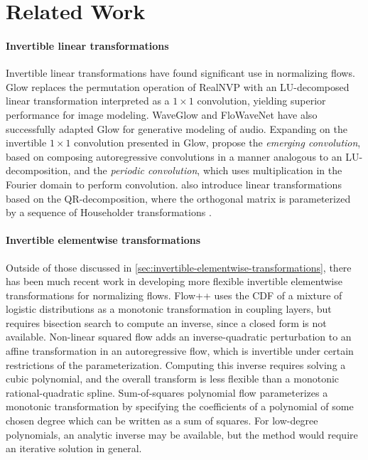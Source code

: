 \section{Related Work}

\paragraph{Invertible linear transformations} 
Invertible linear transformations have found significant use in normalizing flows. 
Glow \citep{Kingma:2018:glow} replaces the permutation operation of RealNVP with an LU-decomposed linear transformation interpreted as a $ 1 \!\times\! 1 $ convolution, yielding superior performance for image modeling. 
WaveGlow \citep{Prenger:2018:WaveGlow} and FloWaveNet \citep{Kim:2018:FloWaveNet} have also successfully adapted Glow for generative modeling of audio. 
Expanding on the invertible $ 1 \!\times\! 1 $ convolution presented in Glow, \citet{Hoogeboom:2019:emerging} propose the \emph{emerging convolution}, based on composing autoregressive convolutions in a manner analogous to an LU-decomposition, and the \emph{periodic convolution}, which uses multiplication in the Fourier domain to perform convolution. 
\citet{Hoogeboom:2019:emerging} also introduce linear transformations based on the QR-decomposition, where the orthogonal matrix is parameterized by a sequence of Householder transformations \citep{Tomczak:2016:householder}. 

\paragraph{Invertible elementwise transformations} 
Outside of those discussed in \cref{sec:invertible-elementwise-transformations}, there has been much recent work in developing more flexible invertible elementwise transformations for normalizing flows. 
Flow++ \citep{Ho:2019:flowpp} uses the CDF of  a mixture of logistic distributions as a monotonic transformation in coupling layers, but requires bisection search to compute an inverse, since a closed form is not available. 
Non-linear squared flow \citep{Ziegler:2019:latent_flows} adds an inverse-quadratic perturbation to an affine transformation in an autoregressive flow, which is invertible under certain restrictions of the parameterization. 
Computing this inverse requires solving a cubic polynomial, and the overall transform is less flexible than a monotonic rational-quadratic spline. 
Sum-of-squares polynomial flow \citep[SOS,][]{jaini:2019:sosflow} parameterizes a monotonic transformation by specifying the coefficients of a polynomial of some chosen degree which can be written as a sum of squares. 
For low-degree polynomials, an analytic inverse may be available, but the method would require an iterative solution in general.

